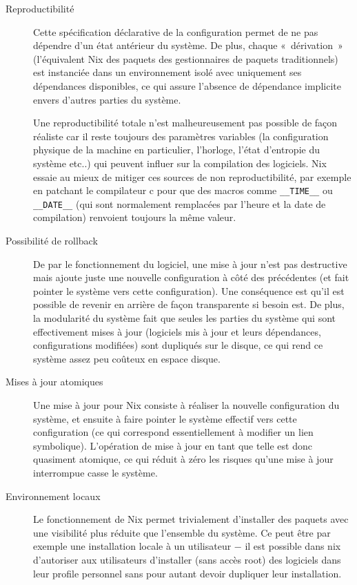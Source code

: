 \begin{description}
  \item[Reproductibilité] Cette spécification déclarative de la configuration
    permet de ne pas dépendre d'un état antérieur du système.
    De plus, chaque « dérivation » (l'équivalent Nix des paquets des
    gestionnaires de paquets traditionnels) est instanciée dans un
    environnement isolé avec uniquement ses dépendances disponibles, ce qui
    assure l'absence de dépendance implicite envers d'autres parties du système.

    Une reproductibilité totale n'est malheureusement pas possible de façon
    réaliste car il reste toujours des paramètres variables (la configuration
    physique de la machine en particulier, l'horloge, l'état d'entropie du
    système etc..) qui peuvent influer sur la compilation des logiciels. Nix
    essaie au mieux de mitiger ces sources de non reproductibilité, par exemple
    en patchant le compilateur c pour que des macros comme \verb|__TIME__| ou
    \verb|__DATE__| (qui sont normalement remplacées par l'heure et la date de
    compilation) renvoient toujours la même valeur.

  \item[Possibilité de rollback] De par le fonctionnement du logiciel, une mise
    à jour n'est pas destructive mais ajoute juste une nouvelle configuration à
    côté des précédentes (et fait pointer le système vers cette configuration).
    Une conséquence est qu'il est possible de revenir en arrière de façon
    transparente si besoin est.
    De plus, la modularité du système fait que seules les parties du système
    qui sont effectivement mises à jour (logiciels mis à jour et leurs
    dépendances, configurations modifiées) sont dupliqués sur le disque, ce qui
    rend ce système assez peu coûteux en espace disque.

  \item[Mises à jour atomiques] Une mise à jour pour Nix consiste à réaliser la
    nouvelle configuration du système, et ensuite à faire pointer le système
    effectif vers cette configuration (ce qui correspond essentiellement à
    modifier un lien symbolique). L'opération de mise à jour en tant que
    telle est donc quasiment atomique, ce qui réduit à zéro les risques qu'une
    mise à jour interrompue casse le système.

  \item[Environnement locaux] Le fonctionnement de Nix permet trivialement
    d'installer des paquets avec une visibilité plus réduite que l'ensemble du
    système. Ce peut être par exemple une installation locale à un utilisateur
    − il est possible dans nix d'autoriser aux utilisateurs d'installer (sans
    accès root) des logiciels dans leur profile personnel sans pour autant
    devoir dupliquer leur installation.


\end{description}
